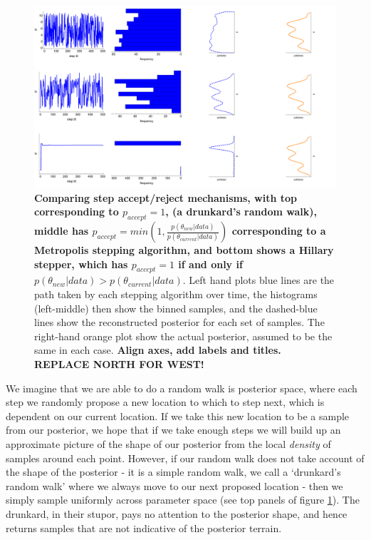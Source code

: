\documentclass[11pt,fullpage]{book}
\begin{document}
\begin{figure}
\centerline{\includegraphics[width=1.5\textwidth]{metropolisHastings_definingMetropolis.pdf}}
\caption{\textbf{Comparing step accept/reject mechanisms, with top corresponding to $p_{accept}=1$, (a drunkard's random walk), middle has $p_{accept}=min(1,\frac{p(\theta_{new}|data)}{p(\theta_{current}|data)})$ corresponding to a Metropolis stepping algorithm, and bottom shows a Hillary stepper, which has $p_{accept}=1$ if and only if $p(\theta_{new}|data)>p(\theta_{current}|data)$}. Left hand plots blue lines are the path taken by each stepping algorithm over time, the histograms (left-middle) then show the binned samples, and the dashed-blue lines show the reconstructed posterior for each set of samples. The right-hand orange plot show the actual posterior, assumed to be the same in each case. \textbf{Align axes, add labels and titles. REPLACE NORTH FOR WEST!}}\label{fig:metropolisHastings_definingMetropolis}
\end{figure}

We imagine that we are able to do a random walk is posterior space, where each step we randomly propose a new location to which to step next, which is dependent on our current location. If we take this new location to be a sample from our posterior, we hope that if we take enough steps we will build up an approximate picture of the shape of our posterior from the local \textit{density} of samples around each point. However, if our random walk does not take account of the shape of the posterior - it is a simple random walk, we call a `drunkard's random walk' where we always move to our next proposed location - then we simply sample uniformly across parameter space (see top panels of figure \ref{fig:metropolisHastings_definingMetropolis}). The drunkard, in their stupor, pays no attention to the posterior shape, and hence returns samples that are not indicative of the posterior terrain.
\end{document}
